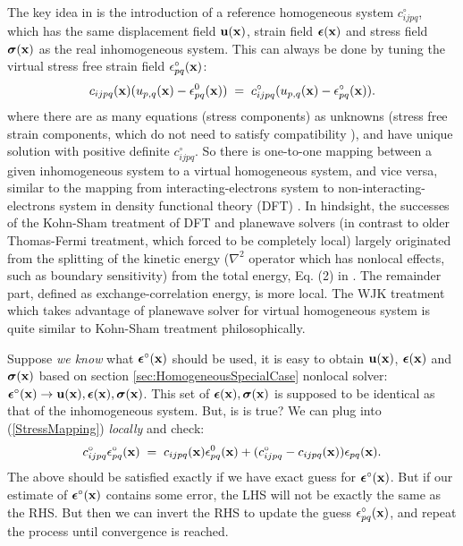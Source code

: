 \documentclass[12pt]{article}
\def\bmath#1{\mbox{\boldmath$#1$}}
\begin{document}
The key idea in \cite{WangJK02} is the introduction of a reference
homogeneous system $c^\circ_{ijpq}$, which has the same displacement
field ${\bf u}({\bf x})$, strain field $\bmath{\epsilon}({\bf x})$ and
stress field $\bmath{\sigma}({\bf x})$ as the real inhomogeneous
system.  This can always be done by tuning the virtual stress free
strain field $\epsilon^\circ_{pq}({\bf x})$:
\begin{equation}
 c_{ijpq}({\bf x}) ( u_{p,q}({\bf x}) - \epsilon^0_{pq}({\bf x})) \;=\; 
 c^\circ_{ijpq} (u_{p,q}({\bf x}) - \epsilon^\circ_{pq}({\bf x})).
 \label{StressMapping}
\end{equation}
where there are as many equations (stress components) as unknowns
(stress free strain components, which do not need to satisfy
compatibility \cite{Jagla07}), and have unique solution with positive
definite $c^\circ_{ijpq}$.  So there is one-to-one mapping between a
given inhomogeneous system to a virtual homogeneous system, and vice
versa, similar to the mapping from interacting-electrons system to
non-interacting-electrons system in density functional theory (DFT)
\cite{KohnS65}.  In hindsight, the successes of the Kohn-Sham
treatment of DFT and planewave solvers (in contrast to older
Thomas-Fermi treatment, which forced to be completely local) largely
originated from the splitting of the kinetic energy ($\nabla^2$
operator which has nonlocal effects, such as boundary sensitivity)
from the total energy, Eq. (2) in \cite{KohnS65}.  The remainder part,
defined as exchange-correlation energy, is more local.  The WJK
treatment which takes advantage of planewave solver for virtual
homogeneous system is quite similar to Kohn-Sham treatment
philosophically.

Suppose {\em we know} what $\bmath{\epsilon}^\circ({\bf x})$ should be
used, it is easy to obtain ${\bf u}({\bf x})$, $\bmath{\epsilon}({\bf
x})$ and $\bmath{\sigma}({\bf x})$ based on section
\ref{sec:HomogeneousSpecialCase} nonlocal solver:
$\bmath{\epsilon}^\circ({\bf x}) \rightarrow {\bf u}({\bf
x}),\bmath{\epsilon}({\bf x}),\bmath{\sigma}({\bf x})$. This set of
$\bmath{\epsilon}({\bf x}),\bmath{\sigma}({\bf x})$ is supposed to be
identical as that of the inhomogeneous system.  But, is is true?  We
can plug into (\ref{StressMapping}) {\em locally} and check:
\begin{equation}
 c^\circ_{ijpq} \epsilon^\circ_{pq}({\bf x}) \;=\; 
 c_{ijpq}({\bf x}) \epsilon^0_{pq}({\bf x}) + 
 (c^\circ_{ijpq} - c_{ijpq}({\bf x})) \epsilon_{pq}({\bf x}).
 \label{RealSpaceInversion}
\end{equation}
The above should be satisfied exactly if we have exact guess for
$\bmath{\epsilon}^\circ({\bf x})$.  But if our estimate of
$\bmath{\epsilon}^\circ({\bf x})$ contains some error, the LHS will
not be exactly the same as the RHS.  But then we can invert the RHS to
update the guess $\epsilon^\circ_{pq}({\bf x})$, and repeat the
process until convergence is reached.
\end{document}
